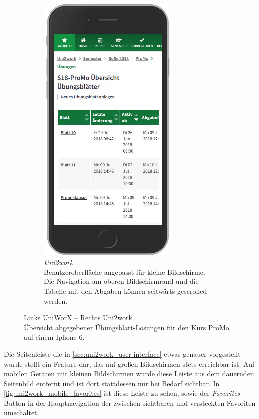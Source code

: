 \documentclass[11pt,a4paper,twoside,ngerman]{article}
\begin{document}
\begin{figure}[h]
\begin{subfigure}{.49\textwidth}
      \includegraphics[width=67mm]{images/m_uni2work_sheets_green.jpg}
      \caption{\textit{Uni2work} \\ Benutzeroberfläche angepasst für kleine Bildschirme. Die Navigation am oberen Bildschirmrand und die Tabelle mit den Abgaben können seitwärts gescrolled werden.}
      \label{fig:mobile_comparison_uni2work}
    \end{subfigure}
    \caption{Links UniWorX -- Rechts Uni2work.\\Übersicht abgegebener Übungsblatt-Lösungen für den Kurs ProMo auf einem Iphone 6.}
    \label{fig:mobile_comparison}
\end{figure}

\noindent
Die Seitenleiste die in \autoref{sec:uni2work_user-interface} etwas genauer vorgestellt wurde stellt ein Feature dar, das auf großen Bildschirmen stets erreichbar ist. Auf mobilen Geräten mit kleinen Bildschirmen wurde diese Leiste aus dem dauernden Seitenbild entfernt und ist dort stattdessen nur bei Bedarf sichtbar. In \autoref{fig:uni2work_mobile_favorites} ist diese Leiste zu sehen, sowie der \textit{Favorites}-Button in der Hauptnavigation der zwischen sichtbaren und versteckten Favoriten umschaltet.
\end{document}

